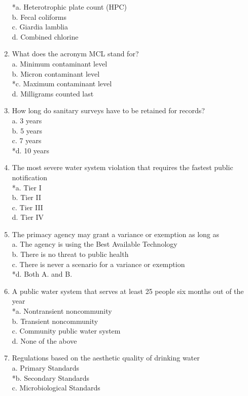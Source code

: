\begin{enumerate}[1.]
*a. Heterotrophic plate count (HPC)\\
b. Fecal coliforms\\
c. Giardia lamblia\\
d. Combined chlorine\\
\item What does the acronym MCL stand for?\\
a. Minimum contaminant level\\
b. Micron contaminant level\\
*c. Maximum contaminant level\\
d. Milligrams counted last\\
\item How long do sanitary surveys have to be retained for records?\\
a. 3 years\\
b. 5 years\\
c. 7 years\\
*d. 10 years\\
\item The most severe water system violation that requires the fastest public notification\\
*a. Tier I\\
b. Tier II\\
c. Tier III\\
d. Tier IV
\item The primacy agency may grant a variance or exemption as long as\\
a. The agency is using the Best Available Technology\\
b. There is no threat to public health\\
c. There is never a scenario for a variance or exemption\\
*d. Both A. and B.\\
\item A public water system that serves at least 25 people six months out of the year\\
*a. Nontransient noncommunity\\
b. Transient noncommunity\\
c. Community public water system\\
d. None of the above\\
\item Regulations based on the aesthetic quality of drinking water\\
a. Primary Standards\\
*b. Secondary Standards\\
c. Microbiological Standards\\

\end{enumerate}
